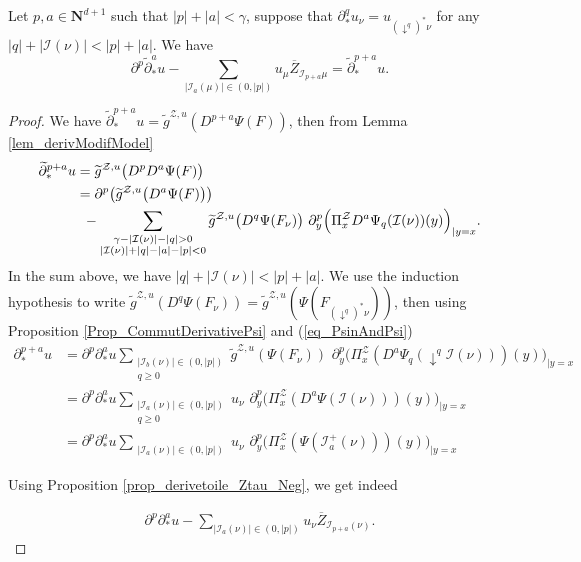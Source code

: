 \documentclass[11pt]{preprint}
\newcommand{\mcI}{\mathcal{I}}
\newcommand{\mcZ}{\mathcal{Z}}
\newcommand{\mcT}{\mathcal{T}}
\def\eps{\varepsilon}
\let\eps\varepsilon
\def\eqref#1{(\ref{#1})}
\newcommand{\bfN}{\mathbf{N}}
\begin{document}
	
	\begin{lemma}\label{lem_halfderivative}
	Let $p,a\in\bfN^{d+1}$ such that $|p|+|a|<\gamma$, suppose that $\partial^q_*u_\nu = u_{(\downarrow^q)^*\nu}$ for any $|q|+|\mcI(\nu)|<  |p|+|a|$. We have 
	\begin{equation}\label{eq_halfstarderiv}
	\partial^p\widetilde\partial^a_* u - \sum_{|\mcI_a(\mu)|\in(0,|p|)} u_\mu \overline{Z}_{\mcI_{p+a}\mu} = \widetilde\partial^{p+a}_* u .
\end{equation}
	\end{lemma}
	
	\begin{proof}
			
			
			We have  $\widetilde\partial^{p+a}_* u =\widetilde{g}^{\mcZ,u}(D^{p+a}\Psi(F)  )$, then from Lemma \ref{lem_derivModifModel}
		\begin{align*}
			\widetilde\partial^{p+a}_*u &= \widetilde{g}^{\mcZ,u}\big(D^{p}D^a\Psi(F)\big)
			\\
			&=  \partial^{p} \big( \widetilde{g}^{\mcZ,u}\big(D^a\Psi(F)\big)\big) \\
			&\enskip - \sum_{\substack{\gamma-|\mcI(\nu)|-|q|>0 \\ |\mcI(\nu)|+|q|-|a|-|p|<0 }} \widetilde{g}^{\mcZ,u}\big(D^q\Psi(F_\nu)\big) \,\, \partial^{p}_y \Big( \Pi_x^\mcZ D^a\Psi_q(\mcI(\nu))  (y)   \Big)_{|y=x}. 
		\end{align*}
		In the sum above, we have $|q|+|\mcI(\nu)|<|p|+|a|$. We use the induction hypothesis to write $\widetilde{g}^{\mcZ,u}(D^q\Psi(F_\nu))= \widetilde{g}^{\mcZ,u}(\Psi(F_{(\downarrow^q)^*\nu}))$, then using Proposition \ref{Prop_CommutDerivativePsi} and \eqref{eq_PsinAndPsi}
		\begin{align*}
			\partial^{p+a}_*u &= 
			\partial^{p} \partial^a_*u \sum_{\substack{|\mcI_b(\nu)|\in(0,|p|)\\ q\geq  0}} \widetilde{g}^{\mcZ,u}(\Psi(F_\nu)) \,\, \partial^{p}_y \Big( \Pi_x^\mcZ( D^a\Psi_q(\downarrow^q\mcI(\nu)))  (y)   \Big)_{|y=x}
			\\
			 &= 
			\partial^{p} \partial^a_*u \sum_{\substack{|\mcI_a(\nu)|\in(0,|p|) \\ q\geq 0 }} u_\nu \,\, \partial^{p}_y \Big( \Pi_x^\mcZ( D^a\Psi(\mcI(\nu)))  (y)   \Big)_{|y=x}
			\\
			 &= 
			\partial^{p} \partial^a_*u \sum_{\substack{|\mcI_a(\nu)|\in(0,|p|) }} u_\nu \,\, \partial^{p}_y \Big( \Pi_x^\mcZ( \Psi(\mcI_a^+(\nu)))  (y)   \Big)_{|y=x}
		\end{align*}
		
		
		
		Using Proposition \ref{prop_derivetoile_Ztau_Neg}, we get indeed
		
		\begin{align*}
		  \partial^{p} \partial^a_*u - \sum_{|\mcI_a(\nu)|\in(0,|p|)}  u_\nu \overline Z_{\mcI_{p+a}(\nu)}. 
		\end{align*}
		
	\end{proof}
	
\end{document}
